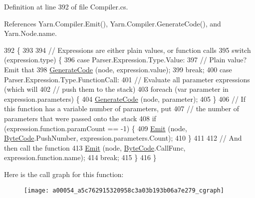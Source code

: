 Definition at line 392 of file Compiler.\-cs.



References Yarn.\-Compiler.\-Emit(), Yarn.\-Compiler.\-Generate\-Code(), and Yarn.\-Node.\-name.


\begin{DoxyCode}
392                                                                    \{
393 
394             \textcolor{comment}{// Expressions are either plain values, or function calls}
395             \textcolor{keywordflow}{switch} (expression.type) \{
396             \textcolor{keywordflow}{case} Parser.Expression.Type.Value:
397                 \textcolor{comment}{// Plain value? Emit that}
398                 \hyperlink{a00054_a006f3becd521cc179ba3d3352f6f930b}{GenerateCode} (node, expression.value);
399                 \textcolor{keywordflow}{break};
400             \textcolor{keywordflow}{case} Parser.Expression.Type.FunctionCall:
401                 \textcolor{comment}{// Evaluate all parameter expressions (which will}
402                 \textcolor{comment}{// push them to the stack)}
403                 \textcolor{keywordflow}{foreach} (var parameter \textcolor{keywordflow}{in} expression.parameters) \{
404                     \hyperlink{a00054_a006f3becd521cc179ba3d3352f6f930b}{GenerateCode} (node, parameter);
405                 \}
406                 \textcolor{comment}{// If this function has a variable number of parameters, put}
407                 \textcolor{comment}{// the number of parameters that were passed onto the stack}
408                 \textcolor{keywordflow}{if} (expression.function.paramCount == -1) \{
409                     \hyperlink{a00054_a774e8c143cdda0584fcfdda98626a83c}{Emit} (node, \hyperlink{a00051_ad5dfb6ee68ca7469623ad3e459f98894}{ByteCode}.PushNumber, expression.parameters.Count);
410                 \}
411 
412                 \textcolor{comment}{// And then call the function}
413                 \hyperlink{a00054_a774e8c143cdda0584fcfdda98626a83c}{Emit} (node, \hyperlink{a00051_ad5dfb6ee68ca7469623ad3e459f98894}{ByteCode}.CallFunc, expression.function.name);
414                 \textcolor{keywordflow}{break};
415             \}
416         \}
\end{DoxyCode}


Here is the call graph for this function\-:
\nopagebreak
\begin{figure}[H]
\begin{center}
\leavevmode
\texttt{[image: a00054\_a5c762915320958c3a03b193b06a7e279\_cgraph]}
\end{center}
\end{figure}


